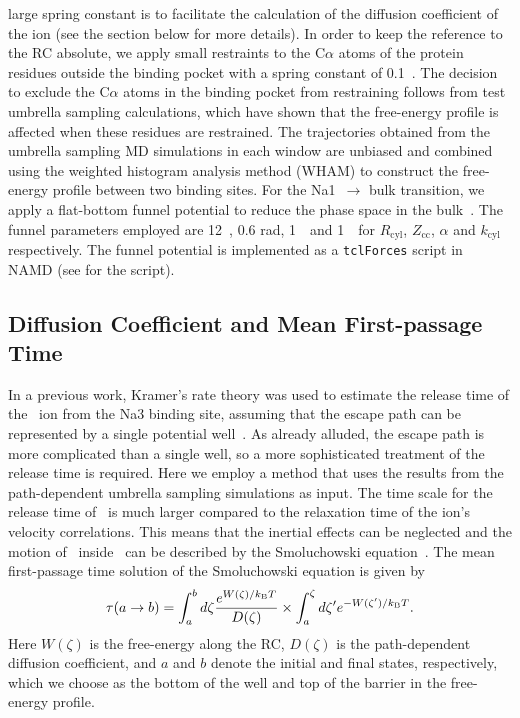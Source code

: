 large spring constant is to facilitate the calculation of the 
diffusion coefficient of the ion (see the section below for more details). In 
order to keep the reference to the RC absolute, we apply small restraints to 
the C$\alpha$ atoms of the protein residues outside the binding pocket with a 
spring constant of 0.1~\spring. The decision to exclude the C$\alpha$ atoms in 
the binding pocket from restraining follows from test umbrella sampling calculations, 
which have shown that the free-energy profile is affected when these residues 
are restrained. The trajectories obtained from the umbrella sampling MD simulations 
in each window are unbiased and combined using the weighted histogram analysis method 
(WHAM) \cite{Kumar1992} to construct the free-energy profile between two binding sites. 
For the Na1\dprim\ $\rightarrow$ bulk transition, we apply a flat-bottom funnel potential 
to reduce the phase space in the bulk~\cite{Limongelli2013}. The funnel parameters 
employed are 12~\angs, 0.6 rad, 1~\angs\  and 1~\spring\ for $R_{\text{cyl}}$, 
$Z_{\text{cc}}$, $\alpha$ and $k_{\text{cyl}}$ respectively. The funnel potential 
is implemented as a \verb+tclForces+ script in NAMD (see  for 
the script).

\subsection{Diffusion Coefficient and Mean First-passage Time}
In a previous work, Kramer's rate theory was used to estimate the release time of the \Na\ ion 
from the Na3 binding site, assuming that the escape path can be represented by a single potential 
well~\cite{Heinzelmann2013}. As already alluded, the escape path is more complicated than a single 
well, so a more sophisticated treatment of the release time is required. Here we employ a method 
that uses the results from the path-dependent umbrella sampling simulations as input. The time scale 
for the release time of \Na\ is much larger compared to the  relaxation time of the ion's velocity 
correlations. This means that the inertial effects can be neglected and the motion of \Na\ inside 
\GltPh\ can be described by the Smoluchowski equation~\cite{Izrailev}. The mean first-passage time 
solution of the Smoluchowski equation is given by~\cite{Szabo1980}
\begin{equation}
 \tau(a\rightarrow b) = \int_{a}^{b} d\zeta 
 \frac{e^{W(\zeta)/k_{\text{B}}T}}{D(\zeta)} 
 \times \int_{a}^{\zeta} d\zeta' e^{-W(\zeta')/k_{\text{B}}T}.
 \label{na3:eq2}
\end{equation}
Here $W(\zeta)$ is the free-energy along the RC, $D(\zeta)$ is the path-dependent diffusion coefficient, 
and $a$ and $b$ denote the initial and final states, respectively, which we choose as the bottom 
of the well and top of the barrier in the free-energy profile. 


